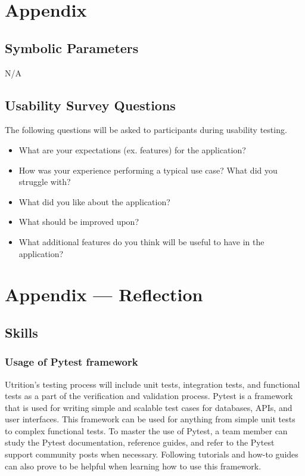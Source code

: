 \documentclass[12pt, titlepage]{article}
\begin{document}
	
	
	
	
	
	
	
	\newpage
	
	\section{Appendix}
	
	\subsection{Symbolic Parameters}
	
	N/A
	
	\subsection{Usability Survey Questions}
	
	The following questions will be asked to participants during usability testing.
	\begin{itemize}
		\item What are your expectations (ex. features) for the application? 
		\item How was your experience performing a typical use case? What did you struggle with? 
		\item What did you like about the application? 
		\item What should be improved upon? 
		\item What additional features do you think will be useful to have in the application? 
	\end{itemize}
	
	\newpage{}
	\section*{Appendix --- Reflection}
	
	\subsection*{Skills}
	
	\subsubsection*{Usage of Pytest framework}
	Utrition's testing process will include unit tests, integration tests, and functional tests as a part of the verification and validation process. Pytest is a framework that is used for writing simple and scalable test cases for databases, APIs, and user interfaces. This framework can be used for anything from simple unit tests to complex functional tests. To master the use of Pytest, a team member can study the Pytest documentation, reference guides, and refer to the Pytest support community posts when necessary. Following tutorials and how-to guides can also prove to be helpful when learning how to use this framework.  
	
\end{document}
